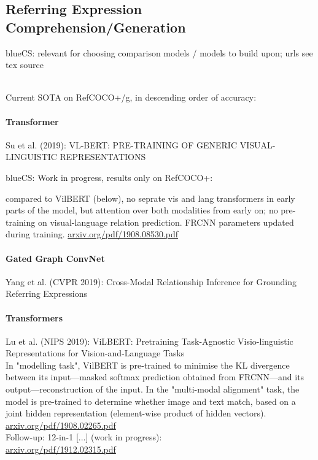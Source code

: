 \documentclass[11pt,a4paper]{article}
\newcommand{\cs}[1]{\begin{color}{blue}CS: #1\end{color}\xspace}
\begin{document}
\subsection{Referring Expression Comprehension/Generation}
\cs{relevant for choosing comparison models / models to build upon; urls see tex source}\\
Current SOTA on RefCOCO+/g, in descending order of accuracy:\\

\paragraph{Transformer}
\noindent
Su et al. (2019): VL-BERT: PRE-TRAINING OF GENERIC VISUAL-LINGUISTIC REPRESENTATIONS\\
\cs{Work in progress, results only on RefCOCO+: } compared to VilBERT (below), no seprate vis and lang transformers in early parts of the model, but attention over both modalities from early on; no pre-training on visual-language relation prediction. FRCNN parameters updated during training. \url{arxiv.org/pdf/1908.08530.pdf}\\

\paragraph{Gated Graph ConvNet}
\noindent
Yang et al. (CVPR 2019): Cross-Modal Relationship Inference for Grounding Referring Expressions\\

\paragraph{Transformers}
\noindent
Lu et al. (NIPS 2019): ViLBERT: Pretraining Task-Agnostic Visio-linguistic Representations for Vision-and-Language Tasks\\
In "modelling task", VilBERT is pre-trained to minimise the KL divergence between its input---masked softmax prediction obtained from FRCNN---and its output---reconstruction of the input. In the "multi-modal alignment" task, the model is pre-trained to determine whether image and text match, based on a joint hidden representation (element-wise product of hidden vectors).\\
 \url{arxiv.org/pdf/1908.02265.pdf}\\
 Follow-up: 12-in-1 [...] (work in progress):\\
\url{arxiv.org/pdf/1912.02315.pdf}\\
\end{document}
